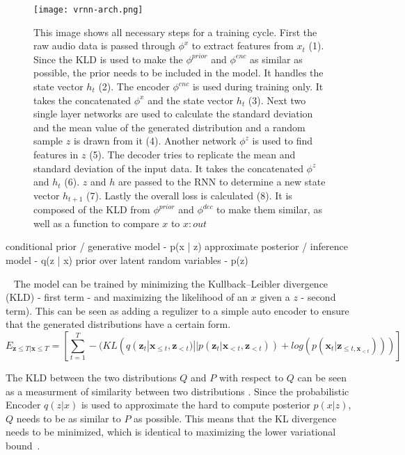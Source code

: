 \documentclass[12pt]{article}
\begin{document}
\begin{figure}
\texttt{[image: vrnn-arch.png]}
\label{fig:vrnn-arch}
\caption{
This image shows all necessary steps for a training cycle.
First the raw audio data is passed through $\phi^x$ to extract features from $x_t$ (1).
Since the KLD is used to make the $\phi^{prior}$ and $\phi^{enc}$ as similar as possible, the prior needs to be included in the model.
It handles the state vector $h_t$ (2).
The encoder $\phi^{enc}$ is used during training only.
It takes the concatenated $\phi^x$ and the state vector $h_t$ (3).
Next two single layer networks are used to calculate the standard deviation and the mean value of the generated distribution and a random sample $z$ is drawn from it (4).
Another network $\phi^z$ is used to find features in $z$ (5).
The decoder tries to replicate the mean and standard deviation of the input data. %
It takes the concatenated $\phi^z$ and $h_t$ (6).
$z$ and $h$ are passed to the RNN to determine a new state vector $h_{t+1}$ (7).
Lastly the overall loss is calculated (8).
It is composed of the KLD from $\phi^{prior}$ and $\phi^{dec}$ to make them similar, as well as a function to compare $x$ to $x:out$ %
}
\end{figure}






conditional prior / generative model - p(x | z)
approximate posterior / inference model - q(z | x)
prior over latent random variables - p(z)


 
The model can be trained by minimizing the Kullback–Leibler divergence (KLD) - first term - and maximizing the likelihood of an $x$ given a $z$ - second term).
This can be seen as adding a regulizer to a simple auto encoder to ensure that the generated distributions have a certain form.
$$
E_{\mathbf{z} \le T | \mathbf{x} \le T} = \left[ \sum_{t=1}^T -(KL(q(\mathbf{z}_t | \mathbf{x}_{\le t}, \mathbf{z}_{<t}) || p(\mathbf{z}_t | \mathbf{x}_{<t}, \mathbf{z}_{<t})) + log(p(\mathbf{x}_t | \mathbf{z}_{\le t, \mathbf{x}_{<t}}))) \right]
$$

The KLD between the two distributions $Q$ and $P$ with respect to $Q$ can be seen as a measurment of similarity between two distributions \cite{}.
Since the probabilistic Encoder $q(z|x)$ is used to approximate the hard to compute posterior $p(x|z)$, $Q$ needs to be as similar to $P$ as possible.
This means that the KL divergence needs to be minimized, which is identical to maximizing the lower variational bound~\cite{kingma2013auto}. 
\end{document}
